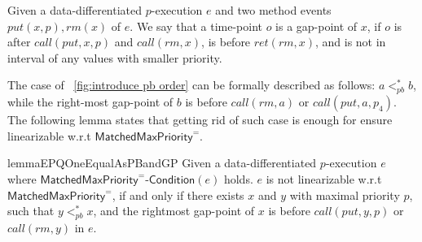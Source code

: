 \begin{definition}\label{def:gap-point for matched put and rm operations}
Given a data-differentiated $p$-execution $e$ and two method events $\textit{put}(x,p),\textit{rm}(x)$ of $e$. We say that a time-point $o$ is a gap-point of $x$, if $o$ is after $\textit{call}(\textit{put},x,p)$ and $\textit{call}(\textit{rm},x)$, is before $\textit{ret}(\textit{rm},x)$, and is not in interval of any values with smaller priority.
\end{definition}

The case of \figurename~\ref{fig:introduce pb order} can be formally described as follows: $a <_{\textit{pb}}^* b$, while the right-most gap-point of $b$ is before $\textit{call}(\textit{rm},a)$ or $\textit{call}(\textit{put},a,p_4)$. The following lemma states that getting rid of such case is enough for ensure linearizable w.r.t $\mathsf{MatchedMaxPriority}^{=}$.

\begin{restatable}{lemma}{EPQOneEqualAsPBandGP}
\label{lemma:EPQ1Equal as pb order and gap-point}
Given a data-differentiated $p$-execution $e$ where $\mathsf{MatchedMaxPriority}^{=}\mathsf{\text{-}Condition}(e)$ holds. $e$ is not linearizable w.r.t $\mathsf{MatchedMaxPriority}^{=}$, if and only if there exists $x$ and $y$ with maximal priority $p$, such that $y <_{\textit{pb}}^* x$, and the rightmost gap-point of $x$ is before $\textit{call}(\textit{put},y,p)$ or $\textit{call}(\textit{rm},y)$ in $e$.
\end{restatable}


